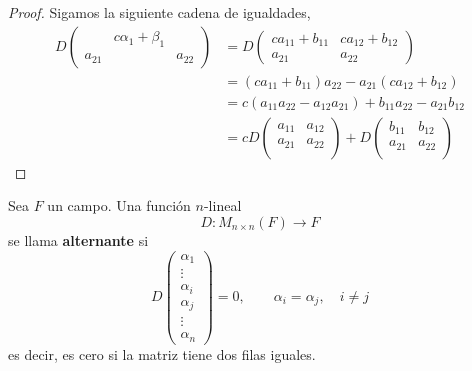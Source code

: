 \documentclass[12pt,a4paper]{book}
\begin{document}
    \begin{proof}
        Sigamos la siguiente cadena de igualdades,
        \begin{align*}
            D
            \begin{pmatrix}
                & c\alpha_1 + \beta_1&\\            
                a_{21}& & a_{22}
            \end{pmatrix} & = 
            D
            \begin{pmatrix}
                ca_{11} + b_{11} & ca_{12} + b_{12}\\
                a_{21} & a_{22}
            \end{pmatrix}\\
            & = (ca_{11} + b_{11})a_{22} - a_{21}(ca_{12} + b_{12})\\
            & = c(a_{11}a_{22} - a_{12}a_{21}) + b_{11}a_{22} - a_{21}b_{12}\\[6pt]
            & = c D\begin{pmatrix}
                a_{11} & a_{12}\\
                a_{21} & a_{22}\\
            \end{pmatrix} + D
            \begin{pmatrix}
                b_{11} & b_{12}\\
                a_{21} & a_{22}\\
            \end{pmatrix}
        \end{align*}
    \end{proof}

    \vspace{1.4cm}

    \begin{definicion}
        Sea $F$ un campo. Una función $n$-lineal
        \[
        D: M_{n \times n}(F) \longrightarrow F
        \]
        se llama \textbf{alternante} si
        \[
        D
        \begin{pmatrix}
            \alpha_1\\
            \vdots\\
            \alpha_i\\
            \alpha_j\\
            \vdots\\
            \alpha_n
        \end{pmatrix} = 0, \qquad \alpha_i = \alpha_j,\quad i \neq j
        \]
        es decir, es cero si la matriz tiene dos filas iguales.
    \end{definicion}
\end{document}
